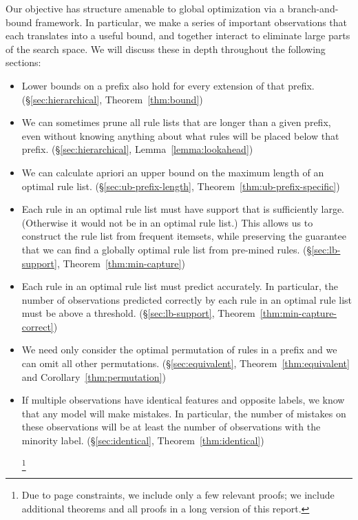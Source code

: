 Our objective has structure amenable to global optimization via a branch-and-bound framework.
%
In particular, we make a series of important observations that each translates into
a useful bound, and together interact to eliminate large parts of the search space.
%
We will discuss these in depth throughout the following sections:
%
\begin{itemize}
\item Lower bounds on a prefix also hold for every extension of that prefix.
(\S\ref{sec:hierarchical}, Theorem~\ref{thm:bound})

\item We can sometimes prune all rule lists that are longer than a given prefix,
even without knowing anything about what rules will be placed below that prefix.
(\S\ref{sec:hierarchical}, Lemma~\ref{lemma:lookahead})

\item We can calculate apriori an upper bound on the maximum length
of an optimal rule list.
(\S\ref{sec:ub-prefix-length}, Theorem~\ref{thm:ub-prefix-specific})

\item Each rule in an optimal rule list must have support that is
sufficiently large. (Otherwise it would not be in an optimal rule list.)
%
This allows us to construct the rule list from frequent itemsets,
while preserving the guarantee that we can find a globally optimal
rule list from pre-mined rules.
(\S\ref{sec:lb-support}, Theorem~\ref{thm:min-capture})

\item Each rule in an optimal rule list must predict accurately.
%
In particular, the number of observations predicted correctly
by each rule in an optimal rule list must be above a threshold.
(\S\ref{sec:lb-support}, Theorem~\ref{thm:min-capture-correct})

\item We need only consider the optimal permutation of rules
in a prefix and we can omit all other permutations.
(\S\ref{sec:equivalent}, Theorem~\ref{thm:equivalent} and Corollary~\ref{thm:permutation})

\item  If multiple observations have identical features and opposite labels,
we know that any model will make mistakes.
%
In particular, the number of mistakes on these observations will be at least
the number of observations with the minority label.
(\S\ref{sec:identical}, Theorem~\ref{thm:identical})
\begin{kdd}
\footnote{Due to page constraints, we include only a few
relevant proofs; we include additional theorems and all proofs
in a long version of this report.}
\end{kdd}
\end{itemize}


